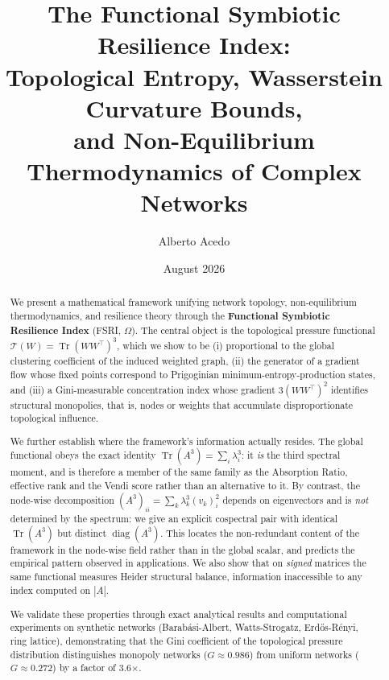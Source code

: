 \documentclass[11pt,a4paper]{article}
\title{\textbf{The Functional Symbiotic Resilience Index:\\
Topological Entropy, Wasserstein Curvature Bounds,\\
and Non-Equilibrium Thermodynamics of Complex Networks}}
\author[1]{Alberto Acedo}
\affil[1]{Biome Makers Inc. \quad \texttt{acedo@biomemakers.com}}
\date{August 2026}
\begin{document}
\maketitle

\begin{abstract}
We present a mathematical framework unifying network topology,
non-equilibrium thermodynamics, and resilience theory through the
\textbf{Functional Symbiotic Resilience Index} (FSRI, $\Omega$).
The central object is the topological pressure functional
$\mathcal{T}(W) = \operatorname{Tr}(WW^\top)^3$, which we show to be
(i) proportional to the global clustering coefficient of the induced
weighted graph, (ii) the generator of a gradient flow whose fixed points
correspond to Prigoginian minimum-entropy-production states, and
(iii) a Gini-measurable concentration index whose gradient $3(WW^\top)^2$
identifies structural monopolies, that is, nodes or weights that accumulate
disproportionate topological influence.

We further establish where the framework's information actually resides.
The global functional obeys the exact identity
$\operatorname{Tr}(A^3) = \sum_i \lambda_i^3$: it \emph{is} the third
spectral moment, and is therefore a member of the same family as the
Absorption Ratio, effective rank and the Vendi score rather than an
alternative to it. By contrast, the node-wise decomposition
$(A^3)_{ii} = \sum_k \lambda_k^3 (v_k)_i^2$ depends on eigenvectors and is
\emph{not} determined by the spectrum: we give an explicit cospectral pair
with identical $\operatorname{Tr}(A^3)$ but distinct
$\operatorname{diag}(A^3)$. This locates the non-redundant content of the
framework in the node-wise field rather than in the global scalar, and
predicts the empirical pattern observed in applications. We also show that
on \emph{signed} matrices the same functional measures Heider structural
balance, information inaccessible to any index computed on $|A|$.

We validate these properties through exact analytical results and
computational experiments on synthetic networks (Barabási-Albert,
Watts-Strogatz, Erdős-Rényi, ring lattice), demonstrating that the
Gini coefficient of the topological pressure distribution distinguishes
monopoly networks ($G \approx 0.986$) from uniform networks
($G \approx 0.272$) by a factor of 3.6×.


\end{abstract}
\end{document}
